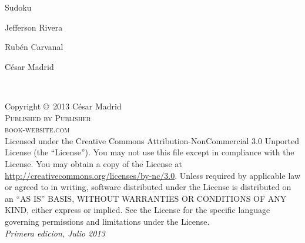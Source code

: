 \documentclass[11pt,fleqn]{book} %
\begin{document}

\begingroup
\thispagestyle{empty}
\centering
\vspace*{9cm}
\par\normalfont\fontsize{35}{35}\sffamily\selectfont
Sudoku\par %
\vspace*{1cm}
{\Huge Jefferson Rivera}\par %
{\Huge Rubén Carvanal}\par %
{\Huge César Madrid}\par %
\endgroup


\newpage
~\vfill
\thispagestyle{empty}

\noindent Copyright \copyright\ 2013 César Madrid\\ %

\noindent \textsc{Published by Publisher}\\ %

\noindent \textsc{book-website.com}\\ %

\noindent Licensed under the Creative Commons Attribution-NonCommercial 3.0 Unported License (the ``License''). You may not use this file except in compliance with the License. You may obtain a copy of the License at \url{http://creativecommons.org/licenses/by-nc/3.0}. Unless required by applicable law or agreed to in writing, software distributed under the License is distributed on an \textsc{``AS IS'' BASIS, WITHOUT WARRANTIES OR CONDITIONS OF ANY KIND}, either express or implied. See the License for the specific language governing permissions and limitations under the License.\\ %

\noindent \textit{Primera edicion, Julio 2013} %

\end{document}
